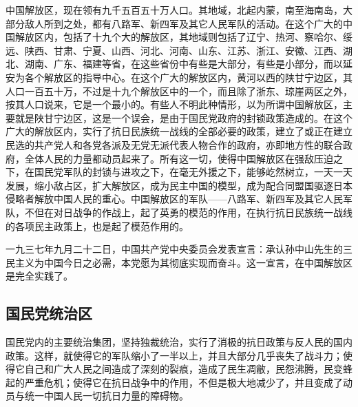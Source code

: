 中国解放区，现在领有九千五百五十万人口。其地域，北起内蒙，南至海南岛，大部分敌人所到之处，都有八路军、新四军及其它人民军队的活动。在这个广大的中国解放区内，包括了十九个大的解放区，其地域则包括了辽宁、热河、察哈尔、绥远、陕西、甘肃、宁夏、山西、河北、河南、山东、江苏、浙江、安徽、江西、湖北、湖南、广东、福建等省，在这些省份中有些是大部分，有些是小部分，而以延安为各个解放区的指导中心。在这个广大的解放区内，黄河以西的陕甘宁边区，其人口一百五十万，不过是十九个解放区中的一个，而且除了浙东、琼崖两区之外，按其人口说来，它是一个最小的。有些人不明此种情形，以为所谓中国解放区，主要就是陕甘宁边区，这是一个误会，是由于国民党政府的封锁政策造成的。在这个广大的解放区内，实行了抗日民族统一战线的全部必要的政策，建立了或正在建立民选的共产党人和各党各派及无党无派代表人物合作的政府，亦即地方性的联合政府，全体人民的力量都动员起来了。所有这一切，使得中国解放区在强敌压迫之下，在国民党军队的封锁与进攻之下，在毫无外援之下，能够屹然树立，一天一天发展，缩小敌占区，扩大解放区，成为民主中国的模型，成为配合同盟国驱逐日本侵略者解放中国人民的重心。中国解放区的军队——八路军、新四军及其它人民军队，不但在对日战争的作战上，起了英勇的模范的作用，在执行抗日民族统一战线的各项民主政策上，也是起了模范作用的。

一九三七年九月二十二日，中国共产党中央委员会发表宣言：承认孙中山先生的三民主义为中国今日之必需，本党愿为其彻底实现而奋斗。这一宣言，在中国解放区是完全实践了。

\subsection{国民党统治区}

国民党内的主要统治集团，坚持独裁统治，实行了消极的抗日政策与反人民的国内政策。这样，就使得它的军队缩小了一半以上，并且大部分几乎丧失了战斗力；使得它自己和广大人民之间造成了深刻的裂痕，造成了民生凋敝，民怨沸腾，民变蜂起的严重危机；使得它在抗日战争中的作用，不但是极大地减少了，并且变成了动员与统一中国人民一切抗日力量的障碍物。

